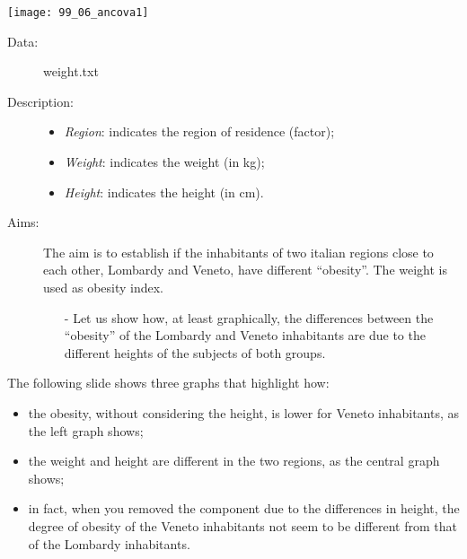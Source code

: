 \begin{frame}
  \vspace{-0.3cm}
  \begin{center}
    \texttt{[image: 99\_06\_ancova1]}
  \end{center}
\end{frame}


\begin{frame}
  \begin{description}
    \item[Data: ]weight.txt \\ 
    \item[Description: ]
      \begin{footnotesize}
        \begin{itemize}
          \item \textit{Region}: indicates the region of residence (factor);
          \item \textit{Weight}: indicates the weight (in kg);
          \item \textit{Height}: indicates the height (in cm).
        \end{itemize}
      \end{footnotesize}
    \item[Aims: ]
      \begin{footnotesize}
        The aim is to establish if the inhabitants of two italian regions close to each other, Lombardy and Veneto, have different ``obesity''. 
        The weight is used as obesity index.
        \begin{itemize}
          \item[-] Let us show how, at least graphically, the differences between the ``obesity'' of the Lombardy and Veneto inhabitants are due to the different heights of the subjects of both groups.
        \end{itemize}
      \end{footnotesize}
  \end{description}
\end{frame}

\begin{frame}
  \vspace{0.5cm}
  The following slide shows three graphs that highlight how:
  \begin{itemize}
    \vspace{0.25cm}
    \item the obesity, without considering the height, is lower for Veneto inhabitants, as the left graph shows;
    \vspace{0.25cm}
    \item the weight and height are different in the two regions, as the central graph shows;
    \vspace{0.25cm}
    \item in fact, when you removed the component due to the differences in height, the degree of obesity of the Veneto inhabitants not seem to be different from that of the Lombardy inhabitants.
  \end{itemize}
\end{frame}

